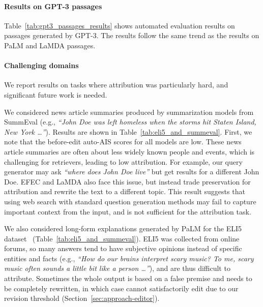 

\paragraph{Results on GPT-3 passages}
Table~\ref{tab:gpt3_passages_results} shows automated evaluation results on passages generated by GPT-3.
The results follow the same trend as the results on PaLM and LaMDA passages.

\paragraph{Challenging domains}
We report results on tasks where attribution was particularly hard, and significant future work is needed.



We considered news article summaries produced by summarization models from SummEval \citep{fabbri21summeval} (e.g., \textit{``John Doe was left homeless when the storms hit Staten Island, New York \dots''}). Results are shown in Table~\ref{tab:eli5_and_summeval}. First, we note that the before-edit auto-AIS scores for all models are low. These news article summaries are often about less widely known people and events, which is challenging for retrievers, leading to low attribution. For example, our query generator may ask \emph{``where does John Doe live''} but get results for a different John Doe. EFEC and LaMDA also face this issue, but instead trade preservation for attribution and rewrite the text to a different topic. 
This result suggests that using web search with standard question generation methods may fail to capture important context from the input, and is not sufficient for the attribution task.

We also considered long-form explanations generated by PaLM for the ELI5 dataset~\citep{fan19eli5} (Table~\ref{tab:eli5_and_summeval}). ELI5 was collected from online forums, so many answers tend to have subjective opinions instead of specific entities and facts (e.g., \textit{``How do our brains interpret scary music? To me, scary music often sounds a little bit like a person \dots''}), and are thus difficult to attribute. Sometimes the whole output is based on a false premise and needs to be completely rewritten, in which case \approach{} cannot satisfactorily edit due to our revision threshold (Section~\ref{sec:approach-editor}). %



